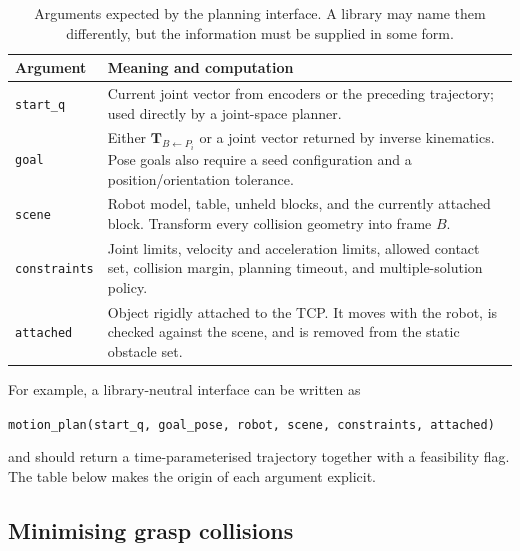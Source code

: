 \documentclass{article}
\begin{document}
\begin{table}[t]
\caption{Arguments expected by the planning interface. A library may name them
differently, but the information must be supplied in some form.}
\label{tab:api}
\centering
\small
\begin{tabularx}{\linewidth}{@{}lX@{}}
\toprule
Argument & Meaning and computation \\
\midrule
\texttt{start\_q} & Current joint vector from encoders or the preceding
trajectory; used directly by a joint-space planner. \\
\texttt{goal} & Either $\mathbf{T}_{B\leftarrow P_i}$ or a joint vector returned
by inverse kinematics. Pose goals also require a seed configuration and a
position/orientation tolerance. \\
\texttt{scene} & Robot model, table, unheld blocks, and the currently attached
block. Transform every collision geometry into frame $B$. \\
\texttt{constraints} & Joint limits, velocity and acceleration limits, allowed
contact set, collision margin, planning timeout, and multiple-solution policy. \\
\texttt{attached} & Object rigidly attached to the TCP. It moves with the robot,
is checked against the scene, and is removed from the static obstacle set. \\
\bottomrule
\end{tabularx}
\end{table}

For example, a library-neutral interface can be written as
\begin{center}
\small
\texttt{motion\_plan(start\_q, goal\_pose, robot, scene, constraints, attached)}
\end{center}
and should return a time-parameterised trajectory together with a feasibility
flag. The table below makes the origin of each argument explicit.

\subsection{Minimising grasp collisions}
\end{document}
